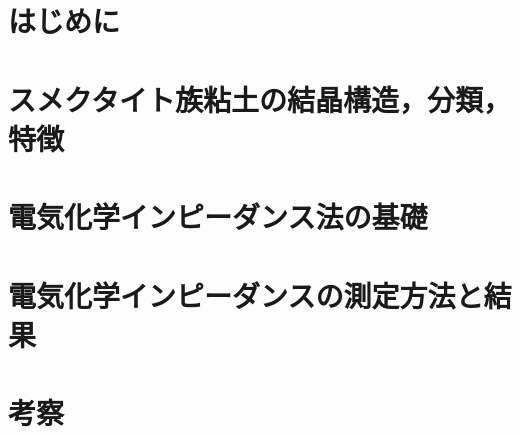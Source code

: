 \documentclass[11pt,a4j]{mybook2}
\begin{document}
\chapter{はじめに}
	
\chapter{スメクタイト族粘土の結晶構造，分類，特徴}
	
\chapter{電気化学インピーダンス法の基礎}
	
\chapter{電気化学インピーダンスの測定方法と結果}
	
\chapter{考察}
	
\end{document}

